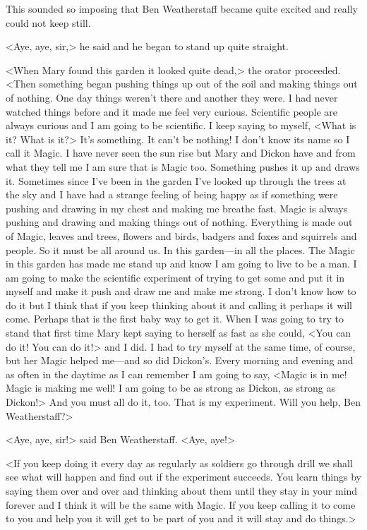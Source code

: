 This sounded so imposing that Ben Weatherstaff became quite excited and really could not keep still.

<Aye, aye, sir,> he said and he began to stand up quite straight.

<When Mary found this garden it looked quite dead,> the orator proceeded. <Then something began pushing things up out of the soil and making things out of nothing. One day things weren't there and another they were. I had never watched things before and it made me feel very curious. Scientific people are always curious and I am going to be scientific. I keep saying to myself, <What is it? What is it?> It's something. It can't be nothing! I don't know its name so I call it Magic. I have never seen the sun rise but Mary and Dickon have and from what they tell me I am sure that is Magic too. Something pushes it up and draws it. Sometimes since I've been in the garden I've looked up through the trees at the sky and I have had a strange feeling of being happy as if something were pushing and drawing in my chest and making me breathe fast. Magic is always pushing and drawing and making things out of nothing. Everything is made out of Magic, leaves and trees, flowers and birds, badgers and foxes and squirrels and people. So it must be all around us. In this garden—in all the places. The Magic in this garden has made me stand up and know I am going to live to be a man. I am going to make the scientific experiment of trying to get some and put it in myself and make it push and draw me and make me strong. I don't know how to do it but I think that if you keep thinking about it and calling it perhaps it will come. Perhaps that is the first baby way to get it. When I was going to try to stand that first time Mary kept saying to herself as fast as she could, <You can do it! You can do it!> and I did. I had to try myself at the same time, of course, but her Magic helped me—and so did Dickon's. Every morning and evening and as often in the daytime as I can remember I am going to say, <Magic is in me! Magic is making me well! I am going to be as strong as Dickon, as strong as Dickon!> And you must all do it, too. That is my experiment. Will you help, Ben Weatherstaff?>

<Aye, aye, sir!> said Ben Weatherstaff. <Aye, aye!>

<If you keep doing it every day as regularly as soldiers go through drill we shall see what will happen and find out if the experiment succeeds. You learn things by saying them over and over and thinking about them until they stay in your mind forever and I think it will be the same with Magic. If you keep calling it to come to you and help you it will get to be part of you and it will stay and do things.>

